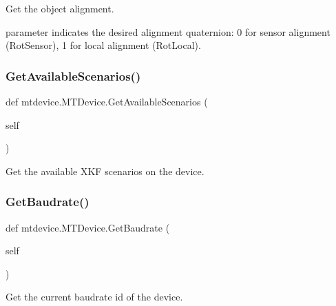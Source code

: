 \begin{DoxyVerb}Get the object alignment.

parameter indicates the desired alignment quaternion:
    0 for sensor alignment (RotSensor),
    1 for local alignment (RotLocal).
\end{DoxyVerb}
 \mbox{\label{classmtdevice_1_1MTDevice_ad55a649988c828b49bc2af507c39da93}} 
\subsubsection{\texorpdfstring{Get\+Available\+Scenarios()}{GetAvailableScenarios()}}
{\footnotesize\ttfamily def mtdevice.\+M\+T\+Device.\+Get\+Available\+Scenarios (\begin{DoxyParamCaption}\item[{}]{self }\end{DoxyParamCaption})}

\begin{DoxyVerb}Get the available XKF scenarios on the device.\end{DoxyVerb}
 \mbox{\label{classmtdevice_1_1MTDevice_a815cba09b30c67bec0c1405dc916cf96}} 
\subsubsection{\texorpdfstring{Get\+Baudrate()}{GetBaudrate()}}
{\footnotesize\ttfamily def mtdevice.\+M\+T\+Device.\+Get\+Baudrate (\begin{DoxyParamCaption}\item[{}]{self }\end{DoxyParamCaption})}

\begin{DoxyVerb}Get the current baudrate id of the device.\end{DoxyVerb}
 \mbox{\label{classmtdevice_1_1MTDevice_a2d75ac2afb3feded6ca6ac0fabb54aef}} 
